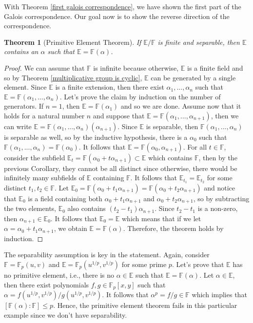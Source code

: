 \documentclass{article}
\theoremstyle{plain}
\newtheorem{theorem}{Theorem}[subsection]
\theoremstyle{definition}
\newcommand{\F}{\mathbb{F}}
\newcommand{\E}{\mathbb{E}}
\begin{document}
With Theorem \ref{first galois correspondence}, we have shown the first part of the Galois correspondence. Our goal now is to show the reverse direction of the correspondence.

\begin{theorem}[Primitive Element Theorem]
\label{Theorem : Primitive Element Theorem}
    If $\E / \F$ is finite and separable, then $\E$ contains an $\alpha$ such that $\E = \F(\alpha)$.
\end{theorem}

\begin{proof}
    We can assume that $\F$ is infinite because otherwise, $\E$ is a finite field and so by Theorem \ref{multiplicative group is cyclic}, $\E$ can be generated by a single element. Since $\E$ is a finite extension, then there exist $\alpha_1, ..., \alpha_n$ such that $\E = \F(\alpha_1, ..., \alpha_n)$. Let's prove the claim by induction on the number of generators. If $n = 1$, then $\E = \F(\alpha_1)$ and so we are done. Assume now that it holds for a natural number $n$ and suppose that $\E = \F(\alpha_1, ..., \alpha_{n+1})$, then we can write $\E = \F(\alpha_1, ..., \alpha_n)(\alpha_{n+1})$. Since $\E$ is separable, then $\F(\alpha_1, ..., \alpha_n)$ is separable as well, so by the inductive hypothesis, there is a $\alpha_0$ such that $\F(\alpha_1, ..., \alpha_n) = \F(\alpha_0)$. It follows that $\E = \F(\alpha_0, \alpha_{n+1})$. For all $t \in \F$, consider the subfield $\E_t = \F(\alpha_0 + t \alpha_{n+1}) \subset \E$ which contains $\F$, then by the previous Corollary, they cannot be all distinct since otherwise, there would be infinitely many subfields of $\E$ containing $\F$. It follows that $\E_{t_1} = \E_{t_2}$ for some distinct $t_1, t_2 \in \F$. Let $\E_0 = \F(\alpha_0 + t_1 \alpha_{n+1}) = \F(\alpha_0 + t_2 \alpha_{n+1})$ and notice that $\E_0$ is a field containing both $\alpha_0 + t_1 \alpha_{n+1}$ and $\alpha_0 + t_2 \alpha_{n+1}$, so by subtracting the two elements, $\E_0$ also contains $(t_2 - t_1)\alpha_{n+1}$. Since $t_2 - t_1$ is a non-zero, then $\alpha_{n+1} \in \E_0$. It follows that $\E_0 = \E$ which means that if we let $\alpha = \alpha_0 + t_1 \alpha_{n+1}$, we obtain $\E = \F(\alpha)$. Therefore, the theorem holds by induction.
\end{proof}

The separability assumption is key in the statement. Again, consider $\F = \F_p(u,v)$ and $\E = \F_p(u^{1/p}, v^{1/p})$ for some prime $p$. Let's prove that $\E$ has no primitive element, i.e., there is no $\alpha \in \E$ such that $\E = \F(\alpha)$. Let $\alpha \in \E$, then there exist polynomials $f,g \in \F_p[x,y]$ such that $\alpha = f(u^{1/p}, v^{1/p})/g(u^{1/p}, v^{1/p})$. It follows that $\alpha^p = f/g \in \F$ which implies that $[\F(\alpha) : \F] \leq p$. Hence, the primitive element theorem fails in this particular example since we don't have separability.
\end{document}

